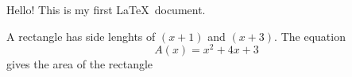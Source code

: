\documentclass[11pt]{article}
\begin{document}
Hello! This is my first \LaTeX\ document.

A rectangle has side lenghts of $(x+1)$ and $(x+3)$.
The equation $${A(x)=x^2+4x+3}$$ gives the area of the rectangle
\end{document}
